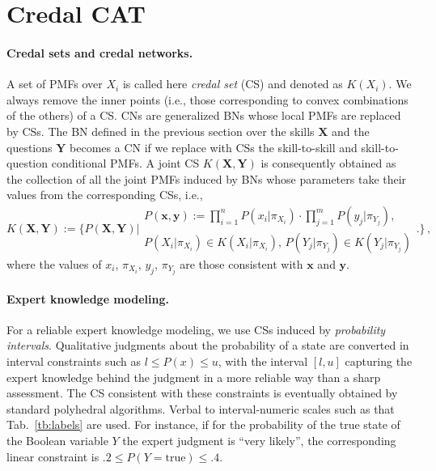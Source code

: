 \documentclass[runningheads]{llncs}
\begin{document}
	
	\section{Credal CAT}
	
	\paragraph{Credal sets and credal networks.} A set of PMFs over $X_i$ is called here 
	\emph{credal set} (CS) and denoted as $K(X_i)$. We always remove the inner points 
	(i.e., those corresponding to convex combinations of the others) of a CS. CNs 
	\cite{cozman2000} are generalized BNs whose local PMFs are replaced by CSs.  The BN 
	defined in the previous section over the skills $\bm{X}$ and the questions $\bm{Y}$ 
	becomes a CN if we replace with CSs the skill-to-skill and skill-to-question conditional 
	PMFs. A joint CS $K(\bm{X},\bm{Y})$ is consequently obtained as the collection of all 
	the joint PMFs induced by BNs whose parameters take their values from the 
	corresponding CSs, i.e., 
	\begin{equation}\label{eq:strongext}
		K(\bm{X},\bm{Y}):=\bigl\{ P(\bm{X},\bm{Y}) \bigl| 
		\substack{
			P(\bm{x},\bm{y}):=\prod_{i=1}^n P(x_i|\pi_{X_i}) \cdot \prod_{j=1}^m P(y_j|\pi_{Y_j}), 
			\\P(X_i|\pi_{X_i}) \in K(X_i|\pi_{X_i}) ,\, P(Y_j|\pi_{Y_j}) \in K(Y_j|\pi_{Y_j})}
		\bigr.
		\bigr\}\,,
	\end{equation}
	where the values of $x_i$, $\pi_{X_i}$, $y_j$, $\pi_{Y_j}$ are those consistent with 
	$\bm{x}$ and $\bm{y}$.
	
	\paragraph{Expert knowledge modeling.} For a reliable expert knowledge modeling, 
	we use CSs induced by \emph{probability intervals}. Qualitative judgments about the 
	probability of a state are converted in interval constraints such as $l\leq P(x) \leq u$, 
	with the interval $[l,u]$ capturing the expert knowledge behind the judgment in a more 
	reliable way than a sharp assessment. The CS consistent with these constraints is 
	eventually obtained by standard polyhedral algorithms. Verbal to interval-numeric 
	scales such as that Tab.~\ref{tb:labels} are used. For instance, if for the probability of 
	the true state of the Boolean variable $Y$ the expert judgment is ``very likely'', the 
	corresponding linear constraint is $.2 \leq P(Y=\textrm{true}) \leq .4$.%
	
\end{document}
